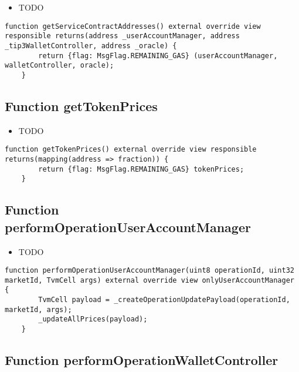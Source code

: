\noindent\begin{itemize}
\item TODO
\end{itemize}

\begin{lstlisting}[firstnumber=215]
    function getServiceContractAddresses() external override view responsible returns(address _userAccountManager, address _tip3WalletController, address _oracle) {
        return {flag: MsgFlag.REMAINING_GAS} (userAccountManager, walletController, oracle);
    }
\end{lstlisting}

\subsection{Function getTokenPrices}

\noindent\begin{itemize}
\item TODO
\end{itemize}

\begin{lstlisting}[firstnumber=219]
    function getTokenPrices() external override view responsible returns(mapping(address => fraction)) {
        return {flag: MsgFlag.REMAINING_GAS} tokenPrices;
    }
\end{lstlisting}

\subsection{Function performOperationUserAccountManager}

\noindent\begin{itemize}
\item TODO
\end{itemize}

\begin{lstlisting}[firstnumber=356]
    function performOperationUserAccountManager(uint8 operationId, uint32 marketId, TvmCell args) external override view onlyUserAccountManager {
        TvmCell payload = _createOperationUpdatePayload(operationId, marketId, args);
        _updateAllPrices(payload);
    }
\end{lstlisting}

\subsection{Function performOperationWalletController}

